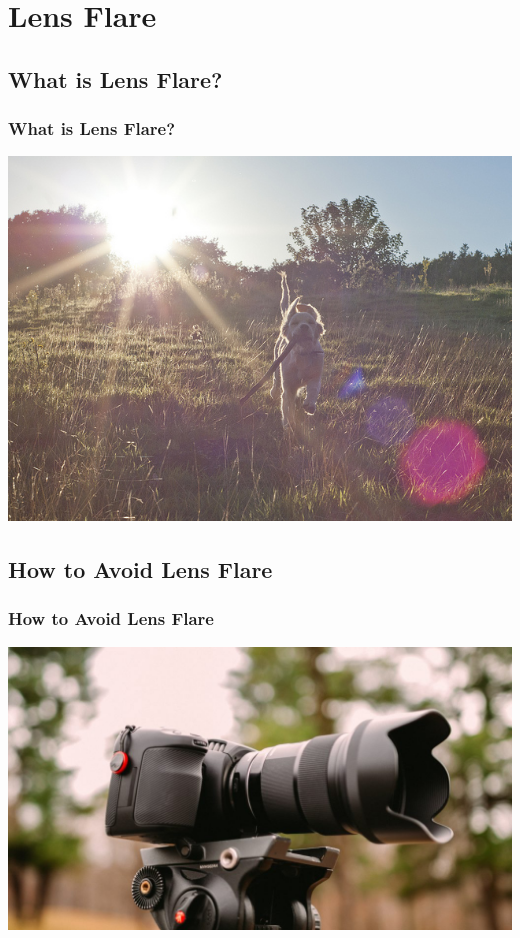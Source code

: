 \documentclass{beamer}
\begin{document}
	\section{Lens Flare}
		\subsection{What is Lens Flare?}		
			\begin{frame}
				\frametitle{What is Lens Flare?}
				\begin{center}
				\includegraphics[width=1.0\textwidth]{images/Beautiful Lens Flare Photographs (13).jpg}
			\end{center}
			\end{frame}
		
		\subsection{How to Avoid Lens Flare}		
\begin{frame}
	\frametitle{How to Avoid Lens Flare}
	\begin{center}
		\includegraphics[width=1.0\textwidth]{images/kushagra-kevat-S1Tnl450Rtg-unsplash-1024x576-1.jpg}
	\end{center}
\end{frame}
\end{document}

